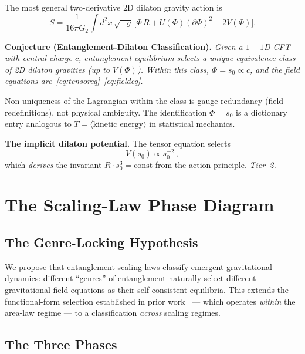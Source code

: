 \documentclass[aps,prd,twocolumn,superscriptaddress,nofootinbib,floatfix]{revtex4-2}
\newcommand{\sn}{s_0}
\begin{document}
The most general two-derivative 2D dilaton gravity action is~\cite{Grumiller2002,BanksOLoughlin1991}
\begin{equation}
S = \frac{1}{16\pi G_2}\int d^2x\,\sqrt{-g}\,\bigl[\Phi\,R + U(\Phi)(\partial\Phi)^2 - 2V(\Phi)\bigr].
\end{equation}

\textbf{Conjecture (Entanglement-Dilaton Classification).} \emph{Given a $1{+}1$D CFT with central charge $c$, entanglement equilibrium selects a unique equivalence class of 2D dilaton gravities (up to $V(\Phi)$). Within this class, $\Phi = \sn \propto c$, and the field equations are~\eqref{eq:tensoreq}--\eqref{eq:fieldeq}.}

Non-uniqueness of the Lagrangian within the class is gauge redundancy (field redefinitions), not physical ambiguity. The identification $\Phi = \sn$ is a dictionary entry analogous to $T = \langle\text{kinetic energy}\rangle$ in statistical mechanics.

\textbf{The implicit dilaton potential.} The tensor equation selects
\begin{equation}
\label{eq:potential}
V(\sn) \propto \sn^{-2}\,,
\end{equation}
which \emph{derives} the invariant $R \cdot \sn^3 = \text{const}$ from the action principle. \emph{Tier~2.}

\section{The Scaling-Law Phase Diagram}
\label{sec:phasediagram}

\subsection{The Genre-Locking Hypothesis}

We propose that entanglement scaling laws classify emergent gravitational dynamics: different ``genres'' of entanglement naturally select different gravitational field equations as their self-consistent equilibria. This extends the functional-form selection established in prior work~\cite{Faulkner2014,Swingle2014,Haehl2018} --- which operates \emph{within} the area-law regime --- to a classification \emph{across} scaling regimes.

\subsection{The Three Phases}
\end{document}
